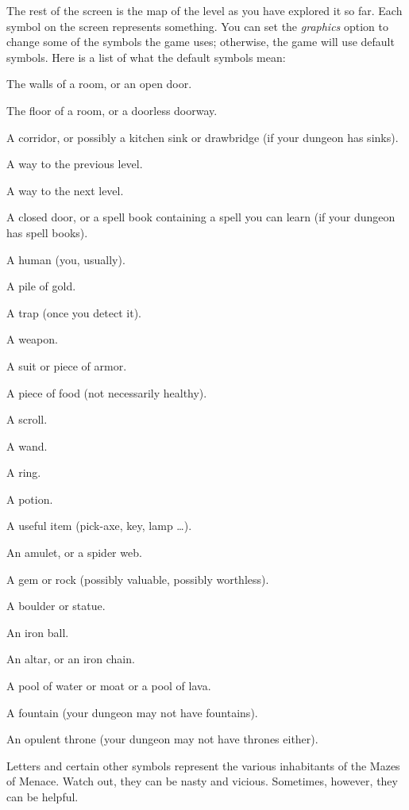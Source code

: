 The rest of the screen is the map of the level as you have explored it
so far.  Each symbol on the screen represents something.  You can set
the {\it graphics\/}
option to change some of the symbols the game uses; otherwise, the
game will use default symbols.  Here is a list of what the default
symbols mean:

\blist{}
\item[\tb{- and |}]
The walls of a room, or an open door.
\item[\tb{.}]
The floor of a room, or a doorless doorway.
\item[\tb{\#}]
A corridor, or possibly a kitchen sink or drawbridge (if your dungeon
has sinks).
\item[\tb{<}]
A way to the previous level.
\item[\tb{>}]
A way to the next level.
\item[\tb{+}]
A closed door, or a spell book containing a spell you can learn (if your
dungeon has spell books).
\item[\tb{@}]
A human (you, usually).
\item[\tb{\$}]
A pile of gold.
\item[\tb{\^}]
A trap (once you detect it).
\item[\tb{)}]
A weapon.
\item[\tb{[}]
A suit or piece of armor.
\item[\tb{\%}]
A piece of food (not necessarily healthy).
\item[\tb{?}]
A scroll.
\item[\tb{/}]
A wand.
\item[\tb{=}]
A ring.
\item[\tb{!}]
A potion.
\item[\tb{(}]
A useful item (pick-axe, key, lamp \ldots).
\item[\tb{"}]
An amulet, or a spider web.
\item[\tb{*}]
A gem or rock (possibly valuable, possibly worthless).
\item[\tb{`}]
A boulder or statue.
\item[\tb{0}]
An iron ball.
\item[\tb{_}]
An altar, or an iron chain.
\item[\tb{\}}]
A pool of water or moat or a pool of lava.
\item[\tb{\{}]
A fountain (your dungeon may not have fountains).
\item[\tb{$\backslash$}]
An opulent throne (your dungeon may not have thrones either).
\item[\tb{a-zA-Z \& other symbols}]
Letters and certain other symbols represent the various inhabitants
of the Mazes of Menace.  Watch out, they can be nasty and vicious.
Sometimes, however, they can be helpful.

